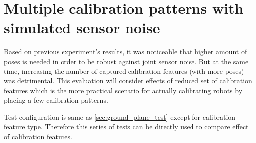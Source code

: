 \documentclass[english, printversion, nomenclature, notitle]{tuvisionthesis} %
\begin{document}
\section{Multiple calibration patterns with simulated sensor noise}

Based on previous experiment's results, it was noticeable that higher amount of poses is needed in order to be robust against joint sensor noise. But at the same time, increasing the number of captured calibration features (with more poses) was detrimental. This evaluation will consider effects of reduced set of calibration features which is the more practical scenario for actually calibrating robots by placing a few calibration patterns.

Test configuration is same as \cref{sec:ground_plane_test} except for calibration feature type. Therefore this series of tests can be directly used to compare effect of calibration features.
%
%		
\end{document}
